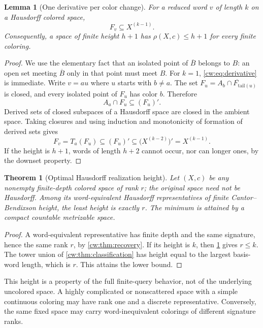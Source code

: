 \documentclass[11pt,letterpaper]{article}
\numberwithin{equation}{section}
\newtheorem{theorem}{Theorem}[section]
\newtheorem{lemma}[lemma]{Lemma}
\theoremstyle{definition}
\theoremstyle{remark}
\theoremstyle{definition}
\newcommand{\cwcl}[1]{\overline{#1}}
\begin{document}
\begin{lemma}[One derivative per color change]\label{cw:lem:derivative}
For a reduced word $v$ of length $k$ on a Hausdorff colored space,
\begin{equation}\label{cw:eq:derivative}
 F_v\subseteq X^{(k-1)}.
\end{equation}
Consequently, a space of finite height $h+1$ has $\rho(X,c)\le h+1$
for every finite coloring.
\end{lemma}
\begin{proof}
We use the elementary fact that an isolated point of $\cwcl B$ belongs to $B$:
an open set meeting $\cwcl B$ only in that point must meet $B$.
For $k=1$, \eqref{cw:eq:derivative} is immediate.
Write $v=au$ where $u$ starts with $b\ne a$. The set
$F_u=\cwcl{A_b\cap F_{\text{tail}(u)}}$ is closed, and every isolated point
of $F_u$ has color $b$. Therefore
\[
 A_a\cap F_u\subseteq(F_u)'.
\]
Derived sets of closed subspaces of a Hausdorff space are closed in the
ambient space. Taking closures and using induction and monotonicity of
formation of derived sets gives
\[
 F_v=T_a(F_u)\subseteq(F_u)'
       \subseteq\bigl(X^{(k-2)}\bigr)'=X^{(k-1)}.
\]
If the height is $h+1$, words of length $h+2$ cannot occur, nor can longer
ones, by the downset property.
\end{proof}

\begin{theorem}[Optimal Hausdorff realization height]\label{cw:thm:minheight}
Let $(X,c)$ be any nonempty finite-depth colored space of rank $r$; the
original space need not be Hausdorff. Among its word-equivalent Hausdorff
representatives of finite Cantor--Bendixson height, the least height is
exactly $r$. The minimum is attained by a compact countable metrizable
space.
\end{theorem}
\begin{proof}
A word-equivalent representative has finite depth and the same signature,
hence the same rank $r$, by \cref{cw:thm:recovery}. If its height is $k$, then
\cref{cw:lem:derivative} gives $r\le k$. The tower union of
\cref{cw:thm:classification} has height equal to the largest basis-word length,
which is $r$. This attains the lower bound.
\end{proof}

This height is a property of the full finite-query behavior, not of the
underlying uncolored space. A highly complicated or nonscattered space with
a simple continuous coloring may have rank one and a discrete representative.
Conversely, the same fixed space may carry word-inequivalent colorings of
different signature ranks.
\end{document}
